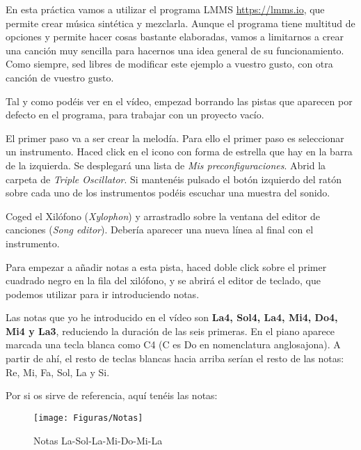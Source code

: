 \documentclass[es,practica]{uah}
\begin{document}

\maketitle



En esta práctica vamos a utilizar el programa LMMS \href{https://lmms.io}{https://lmms.io}, que permite crear música sintética y mezclarla. Aunque el programa tiene multitud de opciones y permite hacer cosas bastante elaboradas, vamos a limitarnos a crear una canción muy sencilla para hacernos una idea general de su funcionamiento. Como siempre, sed libres de modificar este ejemplo a vuestro gusto, con otra canción de vuestro gusto. 

Tal y como podéis ver en el vídeo, empezad borrando las pistas que aparecen por defecto en el programa, para trabajar con un proyecto vacío. 

El primer paso va a ser crear la melodía. Para ello el primer paso es seleccionar un instrumento. Haced click en el icono con forma de estrella que hay en la barra de la izquierda. Se desplegará una lista de \emph{Mis preconfiguraciones}. Abrid la carpeta de \emph{Triple Oscillator}. Si mantenéis pulsado el botón izquierdo del ratón sobre cada uno de los instrumentos podéis escuchar una muestra del sonido. 


Coged el Xilófono (\emph{Xylophon}) y arrastradlo sobre la ventana del editor de canciones (\emph{Song editor}). Debería aparecer una nueva línea al final con el instrumento. 


Para empezar a añadir notas a esta pista, haced doble click sobre el primer cuadrado negro en la fila del xilófono, y se abrirá el editor de teclado, que podemos utilizar para ir introduciendo notas.  

Las notas que yo he introducido en el vídeo son {\bf La4, Sol4, La4, Mi4, Do4, Mi4 y La3}, reduciendo la duración de las seis primeras. En el piano aparece marcada una tecla blanca como C4 (C es Do en nomenclatura anglosajona). A partir de ahí, el resto de teclas blancas hacia arriba serían el resto de las notas: Re, Mi, Fa, Sol, La y Si. 

Por si os sirve de referencia, aquí tenéis las notas:

\begin{figure}[h!]
  \centering
  \texttt{[image: Figuras/Notas]}
  \caption{Notas La-Sol-La-Mi-Do-Mi-La}
\end{figure}
\end{document}
